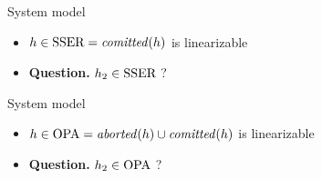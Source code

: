 \begin{frame}{System model}
  \begin{itemize}
  \item $h \in \SSER = \committed{h}$ is linearizable
  \item \textbf{Question.} $h_2 \in \SSER$ ?
  \end{itemize}
      
\end{frame}

\begin{frame}{System model}
  \begin{itemize}
  \item $h \in \OPA = \aborted{h} \union \committed{h}$ is linearizable
  \item \textbf{Question.} $h_2 \in \OPA$ ?
  \end{itemize}
      
\end{frame}
